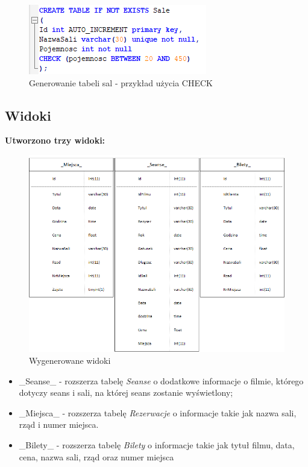\begin{figure} [H]
	\centering
	\includegraphics[width=0.5\linewidth]{rozdzial04/T_Sale.png}
	\caption{Generowanie tabeli sal - przykład użycia CHECK}
	\label{fig:t_sale}
\end{figure}

\subsection{Widoki}

\textbf{Utworzono trzy widoki:}

\begin{figure} [H]
	\centering
	\includegraphics[width=0.8\linewidth]{rozdzial04/widoki.png}
	\caption{Wygenerowane widoki}
	\label{fig:views}
\end{figure}

\begin{itemize}
	\item \_Seanse\_ - rozszerza tabelę \textit{Seanse} o dodatkowe informacje o filmie, którego dotyczy seans i sali, na której seans zostanie wyświetlony;
	\item \_Miejsca\_ - rozszerza tabelę \textit{Rezerwacje} o informacje takie jak nazwa sali, rząd i numer miejsca.
	\item \_Bilety\_ - rozszerza tabelę \textit{Bilety} o informacje takie jak tytuł filmu, data, cena, nazwa sali, rząd oraz numer miejsca
\end{itemize}

